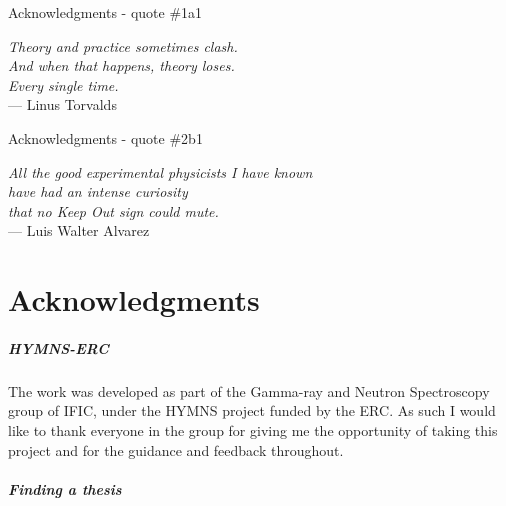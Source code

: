 
\begin{ocg}{Acknowledgments - quote \#1}{a}{1}

\begin{flushright}{\slshape
    Theory and practice sometimes clash.\\
    And when that happens, theory loses.\\
    Every single time. } \\ \medskip
    --- Linus Torvalds
\end{flushright}

\end{ocg}

\medskip

\begin{ocg}{Acknowledgments - quote \#2}{b}{1}

\begin{flushright}{\slshape
    All the good experimental physicists I have known\\
    have had an intense curiosity\\
    that no Keep Out sign could mute.} \\ \medskip
    --- Luis Walter Alvarez
\end{flushright}

\end{ocg}

\bigskip

\begingroup
\let\clearpage\relax
\let\cleardoublepage\relax
\let\cleardoublepage\relax
\chapter*{Acknowledgments}

\paragraph*{HYMNS-ERC}

The work was developed as part of the Gamma-ray and Neutron Spectroscopy group of \ac{IFIC}, under the \ac{HYMNS} project funded by the \ac{ERC}. As such I would like to thank everyone in the group for giving me the opportunity of taking this project and for the guidance and feedback throughout.

\bigskip

\paragraph*{Finding a thesis}

